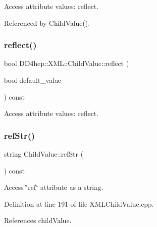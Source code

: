 Access attribute values\+: reflect. 



Referenced by Child\+Value().

\hypertarget{struct_d_d4hep_1_1_x_m_l_1_1_child_value_a55834ecbee97980353b3b351473702b0}{}\label{struct_d_d4hep_1_1_x_m_l_1_1_child_value_a55834ecbee97980353b3b351473702b0} 
\subsubsection{\texorpdfstring{reflect()}{reflect()}\hspace{0.1cm}{\footnotesize\ttfamily [2/2]}}
{\footnotesize\ttfamily bool D\+D4hep\+::\+X\+M\+L\+::\+Child\+Value\+::reflect (\begin{DoxyParamCaption}\item[{bool}]{default\+\_\+value }\end{DoxyParamCaption}) const}



Access attribute values\+: reflect. 

\hypertarget{struct_d_d4hep_1_1_x_m_l_1_1_child_value_aa14791667e4ee10e9fc8ca41933b4e9e}{}\label{struct_d_d4hep_1_1_x_m_l_1_1_child_value_aa14791667e4ee10e9fc8ca41933b4e9e} 
\subsubsection{\texorpdfstring{ref\+Str()}{refStr()}}
{\footnotesize\ttfamily string Child\+Value\+::ref\+Str (\begin{DoxyParamCaption}{ }\end{DoxyParamCaption}) const}



Access \char`\"{}ref\char`\"{} attribute as a string. 



Definition at line 191 of file X\+M\+L\+Child\+Value.\+cpp.



References child\+Value.



